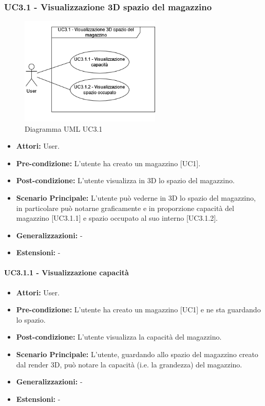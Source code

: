 \subsubsection{UC3.1 - Visualizzazione 3D spazio del magazzino}
\begin{figure}[H]
  \centering
  \includegraphics[width=0.6\textwidth]{UC_diagrams_1-10/UC3.1.drawio.png}
   \caption{Diagramma UML UC3.1}
\end{figure}
\begin{itemize}
    \item \textbf{Attori:} User.
    \item \textbf{Pre-condizione:} L'utente ha creato un magazzino [UC1].
    \item \textbf{Post-condizione:} L'utente visualizza in 3D lo spazio del magazzino.
    \item \textbf{Scenario Principale:}  L'utente può vederne in 3D lo spazio del magazzino, in particolare può notarne graficamente e in proporzione capacità del magazzino [UC3.1.1] e spazio occupato al suo interno [UC3.1.2].
    \item \textbf{Generalizzazioni:} -
    \item \textbf{Estensioni:} -
\end{itemize}


\paragraph{UC3.1.1 - Visualizzazione capacità}
\begin{itemize}
    \item \textbf{Attori:} User.
    \item \textbf{Pre-condizione:} L'utente ha creato un magazzino [UC1] e ne sta guardando lo spazio.
    \item \textbf{Post-condizione:} L'utente visualizza la capacità del magazzino.
    \item \textbf{Scenario Principale:}  L'utente, guardando allo spazio del magazzino creato dal render 3D, può notare la capacità (i.e. la grandezza) del magazzino.
    \item \textbf{Generalizzazioni:} -
    \item \textbf{Estensioni:} -
\end{itemize}


